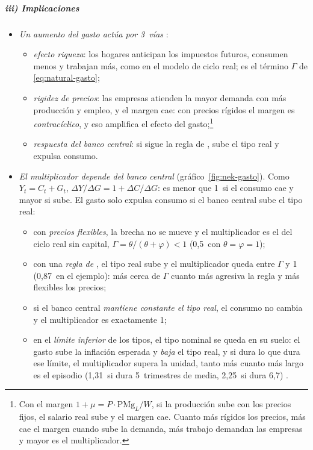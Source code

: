 \documentclass[11pt]{article}
\begin{document}
\subparagraph{iii) Implicaciones}

\begin{itemize}
\item \emph{Un aumento del gasto actúa por 3~vías} :
  \begin{itemize}
  \item \emph{efecto riqueza}: los hogares anticipan los impuestos futuros, consumen menos y trabajan más, como en el modelo de ciclo real; es el término $\Gamma$ de \eqref{eq:natural-gasto};
  \item \emph{rigidez de precios}: las empresas atienden la mayor demanda con más producción y empleo, y el margen cae: con precios rígidos el margen es \emph{contracíclico}, y eso amplifica el efecto del gasto;\footnote{Con el margen $1+\mu=P\cdot\mathrm{PMg}_L/W$, si la producción sube con los precios fijos, el salario real sube y el margen cae. Cuanto más rígidos los precios, más cae el margen cuando sube la demanda, más trabajo demandan las empresas y mayor es el multiplicador.}
  \item \emph{respuesta del banco central}: si sigue la regla de , sube el tipo real y expulsa consumo.
  \end{itemize}
\item \emph{El multiplicador depende del banco central}\nocite{Woodford2011Simple} (gráfico~\ref{fig:nek-gasto}). Como $Y_t=C_t+G_t$, $\Delta Y/\Delta G=1+\Delta C/\Delta G$: es menor que 1~si el consumo cae y mayor si sube. El gasto solo expulsa consumo si el banco central sube el tipo real:
  \begin{itemize}
  \item con \emph{precios flexibles}, la brecha no se mueve y el multiplicador es el del ciclo real sin capital, $\Gamma=\theta/(\theta+\varphi)<1$ (0,5~con $\theta=\varphi=1$);
  \item con una \emph{regla de }, el tipo real sube y el multiplicador queda entre $\Gamma$ y 1 (0,87~en el ejemplo): más cerca de $\Gamma$ cuanto más agresiva la regla y más flexibles los precios;
  \item si el banco central \emph{mantiene constante el tipo real}, el consumo no cambia y el multiplicador es exactamente 1;
  \item en el \emph{límite inferior} de los tipos, el tipo nominal se queda en su suelo: el gasto sube la inflación esperada y \emph{baja} el tipo real, y si dura lo que dura ese límite, el multiplicador supera la unidad, tanto más cuanto más largo es el episodio (1,31~si dura 5~trimestres de media, 2,25~si dura 6,7)\nocite{ChristianoEichenbaumRebelo2011,Eggertsson2011Fiscal} .

\end{itemize}
\end{itemize}
\end{document}
